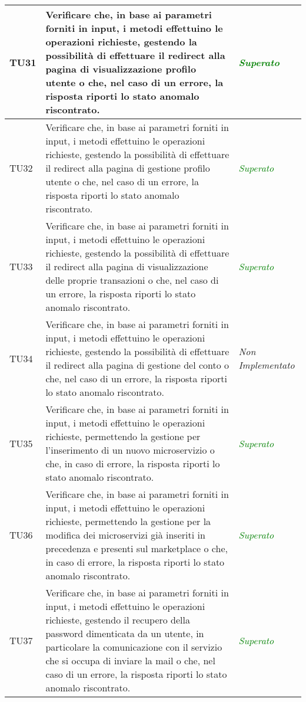 \begin{longtable}{|>{\centering\arraybackslash}p{1.5cm}|>{\centering\arraybackslash}p{8cm} | >{\centering\arraybackslash}p{3.8cm}|}
		\hypertarget{TU31}{TU31} & Verificare che, in base ai parametri forniti in input, i metodi effettuino le operazioni richieste, gestendo la possibilità di effettuare il redirect alla pagina di visualizzazione profilo utente o che, nel caso di un errore, la risposta riporti lo stato anomalo riscontrato. & \textcolor{Green}{\textit{Superato}}\\ \hline
		\hypertarget{TU32}{TU32} & Verificare che, in base ai parametri forniti in input, i metodi effettuino le operazioni richieste, gestendo la possibilità di effettuare il redirect alla pagina di gestione profilo utente o che, nel caso di un errore, la risposta riporti lo stato anomalo riscontrato. & \textcolor{Green}{\textit{Superato}}\\ \hline
		\hypertarget{TU33}{TU33} & Verificare che, in base ai parametri forniti in input, i metodi effettuino le operazioni richieste, gestendo la possibilità di effettuare il redirect alla pagina di visualizzazione delle proprie transazioni o che, nel caso di un errore, la risposta riporti lo stato anomalo riscontrato. & \textcolor{Green}{\textit{Superato}}\\ \hline
		\hypertarget{TU34}{TU34} & Verificare che, in base ai parametri forniti in input, i metodi effettuino le operazioni richieste, gestendo la possibilità di effettuare il redirect alla pagina di gestione del conto o che, nel caso di un errore, la risposta riporti lo stato anomalo riscontrato. & \textit{Non Implementato}\\ \hline
		\hypertarget{TU35}{TU35} & Verificare che, in base ai parametri forniti in input, i metodi effettuino le operazioni richieste, permettendo la gestione per l'inserimento di un nuovo microservizio o che, in caso di errore, la risposta riporti lo stato anomalo riscontrato. & \textcolor{Green}{\textit{Superato}}\\ \hline
		\hypertarget{TU36}{TU36} & Verificare che, in base ai parametri forniti in input, i metodi effettuino le operazioni richieste, permettendo la gestione per la modifica dei microservizi già inseriti in precedenza e presenti sul marketplace o che, in caso di errore, la risposta riporti lo stato anomalo riscontrato. & \textcolor{Green}{\textit{Superato}}\\ \hline
		\hypertarget{TU37}{TU37} & Verificare che, in base ai parametri forniti in input, i metodi effettuino le operazioni richieste, gestendo il recupero della password dimenticata da un utente, in particolare la comunicazione con il servizio che si occupa di inviare la mail o che, nel caso di un errore, la risposta riporti lo stato anomalo riscontrato. & \textcolor{Green}{\textit{Superato}}\\ \hline

\end{longtable}
